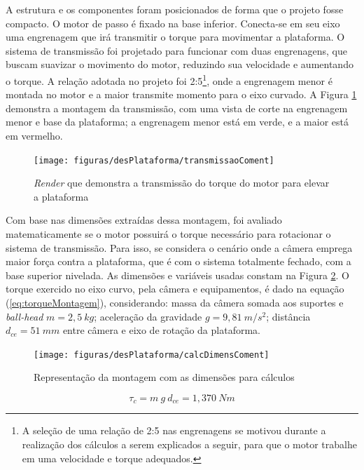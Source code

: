 A estrutura e os componentes foram posicionados de forma que o projeto fosse compacto. O motor de passo é fixado na base inferior. Conecta-se em seu eixo uma engrenagem que irá transmitir o torque para movimentar a plataforma. O sistema de transmissão foi projetado para funcionar com duas engrenagens, que buscam suavizar o movimento do motor, reduzindo sua velocidade e aumentando o torque. A relação adotada no projeto foi 2:5\footnote{A seleção de uma relação de 2:5 nas engrenagens se motivou durante a realização dos cálculos a serem explicados a seguir, para que o motor trabalhe em uma velocidade e torque adequados. }, onde a engrenagem menor é montada no motor e a maior transmite momento para o eixo curvado. A Figura \ref{fig:transmissao} demonstra a montagem da transmissão, com uma vista de corte na engrenagem menor e base da plataforma; a engrenagem menor está em verde, e a maior está em vermelho.

\begin{figure}[!htb]
	\centering
	\caption{\textit{Render} que demonstra a transmissão do torque do motor para elevar a plataforma}
	\texttt{[image: figuras/desPlataforma/transmissaoComent]}
	\label{fig:transmissao}
\end{figure}

Com base nas dimensões extraídas dessa montagem, foi avaliado matematicamente se o motor possuirá o torque necessário para rotacionar o sistema de transmissão. Para isso, se considera o cenário onde a câmera emprega maior força contra a plataforma, que é com o sistema totalmente fechado, com a base superior nivelada. As dimensões e variáveis usadas constam na Figura \ref{fig:calcDimens}. O torque exercido no eixo curvo, pela câmera e equipamentos, é dado na equação (\ref{eq:torqueMontagem}), considerando: massa da câmera somada aos suportes e \textit{ball-head} $ m = 2,5~kg $; aceleração da gravidade $ g = 9,81~m/s^2 $; distância $ d_{ce} = 51~mm $ entre câmera e eixo de rotação da plataforma. 

\begin{figure}[!htb]
	\centering
	\caption{Representação da montagem com as dimensões para cálculos}
	\texttt{[image: figuras/desPlataforma/calcDimensComent]}
	\label{fig:calcDimens}
\end{figure}

\begin{equation}
	\tau_{c} = m~g~d_{ce} = 1,370~Nm
	\label{eq:torqueMontagem}
\end{equation}


